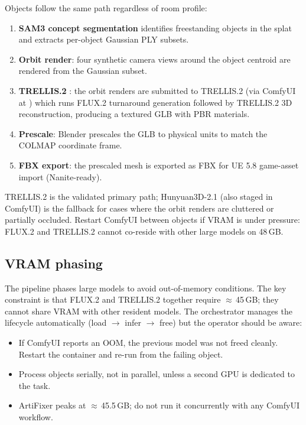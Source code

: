 Objects follow the same path regardless of room profile:

\begin{enumerate}
  \item \textbf{SAM3 concept segmentation} identifies freestanding objects in
        the splat and extracts per-object Gaussian PLY subsets.
  \item \textbf{Orbit render}: four synthetic camera views around the object
        centroid are rendered from the Gaussian subset.
  \item \textbf{TRELLIS.2 }: the orbit renders are submitted to
        TRELLIS.2 (via ComfyUI at ) which runs
        FLUX.2 turnaround generation followed by TRELLIS.2 3D reconstruction,
        producing a textured GLB with PBR materials.
  \item \textbf{Prescale}: Blender prescales the GLB to physical units to match
        the COLMAP coordinate frame.
  \item \textbf{FBX export}: the prescaled mesh is exported as FBX for UE 5.8
        game-asset import (Nanite-ready).
\end{enumerate}

\noindent TRELLIS.2 is the validated primary path; Hunyuan3D-2.1 (also staged
in ComfyUI) is the fallback for cases where the orbit renders are cluttered or
partially occluded.  Restart ComfyUI between objects if VRAM is under pressure:
FLUX.2 and TRELLIS.2 cannot co-reside with other large models on 48\,GB.

\subsection{VRAM phasing}
\label{sec:pb-vram}

The pipeline phases large models to avoid out-of-memory conditions.  The key
constraint is that FLUX.2 and TRELLIS.2 together require $\approx$\,45\,GB; they
cannot share VRAM with other resident models.  The orchestrator manages the
lifecycle automatically (load $\to$ infer $\to$ free) but the operator should
be aware:

\begin{itemize}
  \item If ComfyUI reports an OOM, the previous model was not freed cleanly.
        Restart the  container and re-run from the failing
        object.
  \item Process objects serially, not in parallel, unless a second GPU is
        dedicated to the task.
  \item ArtiFixer peaks at $\approx$\,45.5\,GB; do not run it concurrently with
        any ComfyUI workflow.
\end{itemize}

